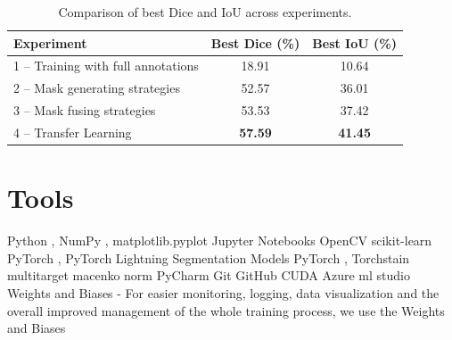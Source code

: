\begin{table}[H]
  \centering
  \begin{tabular}{ l | c | c } 
    \hline
    \textbf{Experiment}                                  & \textbf{Best Dice (\%)} & \textbf{Best IoU (\%)} \\
    \hline
    1 – Training with full annotations                   & 18.91                   & 10.64                  \\
    2 – Mask generating strategies                       & 52.57                   & 36.01                  \\
    3 – Mask fusing strategies                           & 53.53                   & 37.42                  \\
    4 – Transfer Learning                                & \textbf{57.59}          & \textbf{41.45}          \\
    \hline
  \end{tabular}
  \caption{Comparison of best Dice and IoU across experiments.}
  \label{tab:summary-experiments}
\end{table}


\section{Tools}
Python \cite{python}, 
NumPy \cite{numpy}, 
matplotlib.pyplot \cite{matplotlib}
Jupyter Notebooks \cite{jupyter}
OpenCV \cite{open-cv}
scikit-learn \cite{scikit-learn}
PyTorch \cite{pytorch},
PyTorch Lightning \cite{pytorch-ligthning}
Segmentation Models PyTorch \cite{smp}, 
Torchstain multitarget macenko norm \cite{torchstain}
PyCharm \cite{pycharm}
Git \cite{git}
GitHub \cite{github}
CUDA \cite{cuda}
Azure ml studio \cite{azure-ml}
Weights and Biases - For easier monitoring, logging, data visualization and the overall improved management of the whole training process, we use the Weights and Biases \cite{wandb}